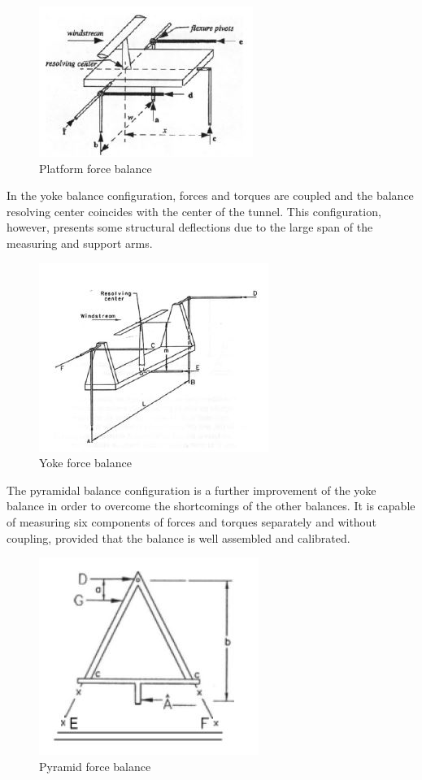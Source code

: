 \begin{center}
	\begin{figure}[H]
		\centering
		\includegraphics{Figures/platform}
		\caption[Platform force balance]{Platform force balance \cite{ferreira2015design}}
	\end{figure}
\end{center}
In the yoke balance configuration, forces and torques are coupled and the balance resolving center coincides with the center of the tunnel. This configuration, however, presents some structural deflections due to the large span of the measuring and support arms.
\begin{center}
	\begin{figure}[H]
		\centering
		\includegraphics{Figures/Yoke}
		\caption[Yoke force balance]{Yoke force balance \cite{ferreira2015design}}
	\end{figure}
\end{center}
The pyramidal balance configuration is a further improvement of the yoke balance in order to overcome the shortcomings of the other balances. It is capable of measuring six components of forces and
torques separately and without coupling, provided that the balance is well assembled and calibrated.
\begin{center}
	\begin{figure}[H]
		\centering
		\includegraphics{Figures/Pyramid}
		\caption[Pyramid force balance]{Pyramid force balance \cite{ferreira2015design}}
	\end{figure}
\end{center}
